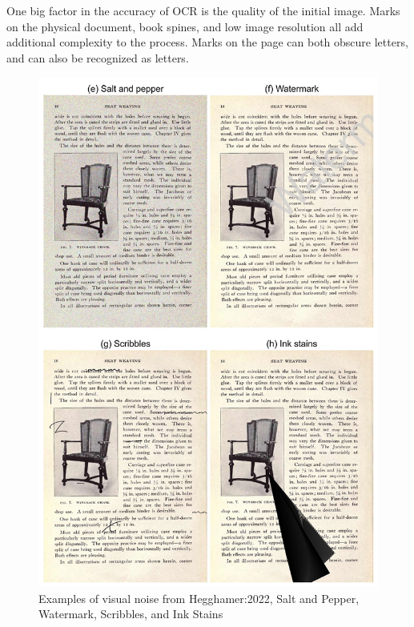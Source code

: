\documentclass[sigplan,screen,nonacm]{acmart-tagged}
\begin{document}
One big factor in the accuracy of OCR is the quality of the initial image. Marks on the physical document, book spines, and low image resolution all add additional complexity to the process. Marks on the page can both obscure letters, and can also be recognized as letters.

\begin{figure}
  \includegraphics[width=\linewidth]{noise.png}
  \caption{Examples of visual noise from Hegghamer:2022, Salt and Pepper, Watermark, Scribbles, and Ink Stains}
  \label{noise:visual}
\end{figure}
\end{document}
